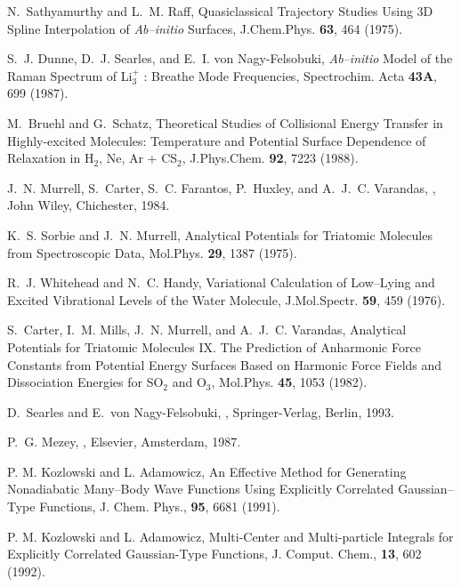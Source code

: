 \begin{thebibliography}{999}
N.~Sathyamurthy and L.~M. Raff,
Quasiclassical Trajectory 
Studies Using 3D Spline Interpolation of {\it Ab--initio} Surfaces,
\newblock J.Chem.Phys. {\bf 63}, 464 (1975).

S.~J. Dunne, D.~J. Searles, and E.~I. {von Nagy-Felsobuki},
{\it Ab--initio} 
Model of the Raman Spectrum of Li$_3^+$ : Breathe Mode Frequencies,
\newblock Spectrochim. Acta {\bf 43A}, 699 (1987).

M.~Bruehl and G.~Schatz,
Theoretical Studies of Collisional Energy Transfer in Highly-excited 
Molecules: Temperature and Potential Surface Dependence of Relaxation
in H$_2$, Ne, Ar + CS$_2$,
\newblock J.Phys.Chem. {\bf 92}, 7223 (1988).

J.~N. Murrell, S.~Carter, 
S.~C. Farantos, P.~Huxley, and A.~J.~C. Varandas,
,
\newblock John Wiley, Chichester, 1984.

K.~S. Sorbie and J.~N. Murrell,
Analytical Potentials for Triatomic Molecules from Spectroscopic Data,
\newblock Mol.Phys. {\bf 29}, 1387 (1975).

R.~J. Whitehead and N.~C. Handy,
Variational Calculation of Low--Lying and Excited Vibrational Levels of
the Water Molecule,
\newblock J.Mol.Spectr. {\bf 59}, 459 (1976).


S.~Carter, I.~M. Mills, J.~N. Murrell, and A.~J.~C. Varandas,
Analytical Potentials for Triatomic Molecules IX. The Prediction of 
Anharmonic Force Constants from Potential Energy Surfaces Based on
Harmonic Force Fields and Dissociation Energies for SO$_2$ and O$_3$,
\newblock Mol.Phys. {\bf 45}, 1053 (1982).

D.~Searles and E.~{von Nagy-Felsobuki},
,
\newblock Springer-Verlag, Berlin, 1993.

P.~G. Mezey,
,
\newblock Elsevier, Amsterdam, 1987.



P. M. Kozlowski and L. Adamowicz, 
An Effective Method for Generating Nonadiabatic
Many--Body Wave Functions Using Explicitly Correlated
Gaussian--Type Functions,
J. Chem. Phys., {\bf 95}, 6681 (1991).

P. M. Kozlowski and L. Adamowicz, 
Multi-Center and Multi-particle Integrals for
Explicitly Correlated Gaussian-Type Functions,
J. Comput. Chem., {\bf 13}, 602 (1992).



\end{thebibliography}
